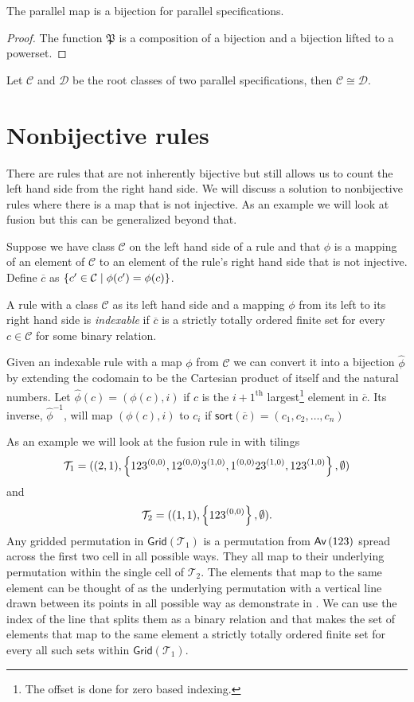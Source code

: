 \begin{proposition}
The parallel map is a bijection for parallel specifications.
\end{proposition}
\begin{proof}
The function $\mathfrak{P}$ is a composition of a bijection and a bijection lifted to a powerset.
\end{proof}
\begin{corollary}
Let $\mathcal{C}$ and $\mathcal{D}$ be the root classes of two parallel specifications, then $\mathcal{C} \cong \mathcal{D}$.
\end{corollary}

\section{Nonbijective rules}
There are rules that are not inherently bijective but still allows us to count the left hand side from the right hand side. We will discuss a solution to nonbijective rules where there is a map that is not injective. As an example we will look at fusion but this can be generalized beyond that.

Suppose we have class $\mathcal{C}$ on the left hand side of a rule and that $\phi$ is a mapping of an element of $\mathcal{C}$ to an element of the rule's right hand side that is not injective. Define $\overline{c}$ as $\left\{c' \in \mathcal{C} \mid \phi(c') = \phi(c)\right\}$. 

\begin{definition}
A rule with a class $\mathcal{C}$ as its left hand side and a mapping $\phi$ from its left to its right hand side is \emph{indexable} if $\overline{c}$ is a strictly totally ordered finite set for every $c \in \mathcal{C}$ for some binary relation.
\end{definition}

Given an indexable rule with a map $\phi$ from $\mathcal{C}$ we can convert it into a bijection 
$\hat{\phi}$ by extending the codomain to be the Cartesian product of itself and the natural numbers. Let $\hat{\phi}(c) = (\phi(c),i)$ if $c$ is the $i+1^\text{th}$ largest\footnote{The offset is done for zero based indexing.} element in $\overline{c}$. Its inverse, $\hat{\phi}^{-1}$, will map $(\phi(c),i)$ to $c_i$ if $\textsf{sort}(\overline{c}) = (c_1,c_2,\dotsc,c_n)$

As an example we will look at the fusion rule in  with tilings
\[
    \mathcal{T}_1 = ((2,1), \left\{123^{(0,0)},12^{(0,0)}3^{(1,0)},1^{(0,0)}23^{(1,0)},123^{(1,0)}\right\}, \emptyset)
\]
and
\[
    \mathcal{T}_2 = ((1,1),\left\{123^{(0,0)}\right\}, \emptyset).
\]
Any gridded permutation in $\textsf{Grid}(\mathcal{T}_1)$ is a permutation from $\textsf{Av}\left(123\right)$ spread across the first two cell in all possible ways. They all map to their underlying permutation within the single cell of $\mathcal{T}_2$. The elements that map to the same element can be thought of as the underlying permutation with a vertical line drawn between its points in all possible way as demonstrate in . We can use the index of the line that splits them as a binary relation and that makes the set of elements that map to the same element a strictly totally ordered finite set for every all such sets within $\textsf{Grid}(\mathcal{T}_1)$.


